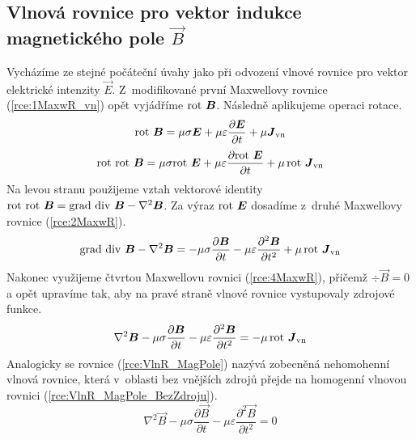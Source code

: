 \subsection{Vlnová rovnice pro vektor indukce magnetického pole $\vec B$}
Vycházíme ze stejné počáteční úvahy jako při odvození vlnové rovnice pro vektor elektrické intenzity $\vec E$. Z~modifikované první Maxwellovy rovnice (\ref{rce:1MaxwR_vn}) opět vyjádříme $\mathrm{rot}\  \mbox{\boldmath$B$}$. Následně aplikujeme operaci rotace.
\begin{displaymath}
	\mathrm{rot}\ \mbox{\boldmath$B$} = \mu\sigma\mbox{\boldmath$E$}+\mu\varepsilon\frac{\partial\mbox{\boldmath$E$}}{\partial t}+\mu\mbox{\boldmath$J$}_{\mathrm{vn}}
\end{displaymath}
\begin{displaymath}
	\mathrm{rot}\ \mathrm{rot}\ \mbox{\boldmath$B$} = \mu\sigma\mathrm{rot}\ \mbox{\boldmath$E$}+\mu\varepsilon\frac{\partial \mathrm{rot}\ \mbox{\boldmath$E$}}{\partial t}+\mu\,\mathrm{rot}\ \mbox{\boldmath$J$}_{\mathrm{vn}}
\end{displaymath}
Na levou stranu použijeme vztah vektorové identity $\mathrm{rot}\ \mathrm{rot}\ \mbox{\boldmath$B$} = \mathrm{grad}\ \mathrm{div}\ \mbox{\boldmath$B$} - \nabla^{2}\mbox{\boldmath$B$}$. Za výraz $\mathrm{rot}\  \mbox{\boldmath$E$}$ dosadíme z~druhé Maxwellovy rovnice (\ref{rce:2MaxwR}). 
\begin{displaymath}
	\mathrm{grad}\ \mathrm{div}\ \mbox{\boldmath$B$} - \nabla^{2}\mbox{\boldmath$B$} = -\mu\sigma\frac{\partial\mbox{\boldmath$B$}}{\partial t}-\mu\varepsilon\frac{\partial^{2}\mbox{\boldmath$B$}}{\partial t^{2}}+\mu\,\mathrm{rot}\ \mbox{\boldmath$J$}_{\mathrm{vn}}
\end{displaymath}
Nakonec využijeme čtvrtou Maxwellovu rovnici (\ref{rce:4MaxwR}), přičemž $\div \vec B = 0$ a opět upravíme tak, aby na pravé straně vlnové rovnice vystupovaly zdrojové funkce.
\begin{equation}
	\nabla^{2}\mbox{\boldmath$B$} -\mu\sigma\frac{\partial\mbox{\boldmath$B$}}{\partial t}-\mu\varepsilon\frac{\partial^{2}\mbox{\boldmath$B$}}{\partial t^{2}}= -\mu\,\mathrm{rot}\ \mbox{\boldmath$J$}_{\mathrm{vn}}
	\label{rce:VlnR_MagPole}
\end{equation}
Analogicky se rovnice (\ref{rce:VlnR_MagPole}) nazývá zobecněná nehomohenní vlnová rovnice, která v~oblasti bez vnějších zdrojů přejde na homogenní vlnovou rovnici (\ref{rce:VlnR_MagPole_BezZdroju}).
\begin{equation}
	\nabla^{2}\vec B -\mu\sigma\frac{\partial\vec B}{\partial t}-\mu\varepsilon\frac{\partial^{2}\vec B}{\partial t^{2}}= 0
	\label{rce:VlnR_MagPole_BezZdroju}
\end{equation}


